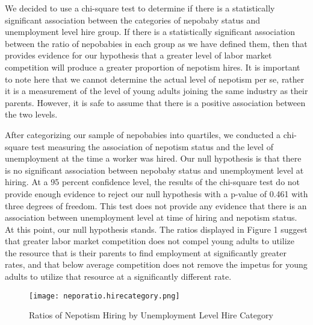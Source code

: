 \documentclass[12pt]{article}
\begin{document}
We decided to use a chi-square test to determine if there is a statistically significant association between the categories of nepobaby status and unemployment level hire group. If there is a statistically significant association between the ratio of nepobabies in each group as we have defined them, then that provides evidence for our hypothesis that a greater level of labor market competition will produce a greater proportion of nepotism hires. It is important to note here that we cannot determine the actual level of nepotism per se, rather it is a measurement of the level of young adults joining the same industry as their parents. However, it is safe to assume that there is a positive association between the two levels.

After categorizing our sample of nepobabies into quartiles, we conducted a chi-square test measuring the association of nepotism status and the level of unemployment at the time a worker was hired. Our null hypothesis is that there is no significant association between nepobaby status and unemployment level at hiring. At a 95 percent confidence level, the results of the chi-square test do not provide enough evidence to reject our null hypothesis with a p-value of 0.461 with three degrees of freedom. This test does not provide any evidence that there is an association between unemployment level at time of hiring and nepotism status. At this point, our null hypothesis stands. The ratios displayed in Figure 1 suggest that greater labor market competition does not compel young adults to utilize the resource that is their parents to find employment at significantly greater rates, and that below average competition does not remove the impetus for young adults to utilize that resource at a significantly different rate.

\begin{figure}
    \centering
    \texttt{[image: neporatio.hirecategory.png]}
    \caption{Ratios of Nepotism Hiring by Unemployment Level Hire Category}
    \label{fig:enter-label}
\end{figure}
\end{document}
